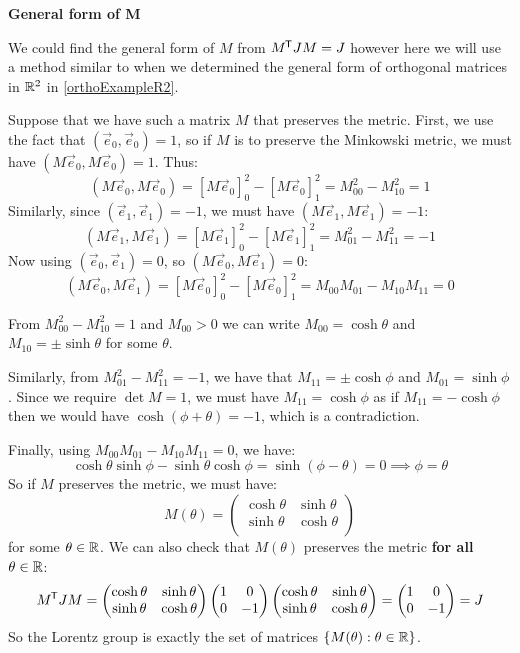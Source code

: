 \documentclass[../main.tex]{subfiles}
\begin{document}
\textbf{General form of M}\par
We could find the general form of $M$ from $M^{{\mkern-1.5mu\mathsf{T}}}JM = J$ however here we will use a method similar to when we determined the general form of orthogonal matrices in $\mathbb{R}^2$ in \cref{orthoExampleR2}.

Suppose that we have such a matrix $M$ that preserves the metric.
First, we use the fact that $(\vec{e}_0, \vec{e}_0) = 1$, so if $M$ is to preserve the Minkowski metric, we must have $(M\vec{e}_0, M\vec{e}_0) = 1$.
Thus:
\[
  (M\vec{e}_0, M\vec{e}_0) = [M\vec{e}_0]^2_0 - [M\vec{e}_0]^2_1 = M_{0 0}^2 - M_{1 0}^2 = 1
\]
Similarly, since $(\vec{e}_1, \vec{e}_1) = -1$, we must have $(M\vec{e}_1, M\vec{e}_1) = -1$:
\[
  (M\vec{e}_1, M\vec{e}_1) = [M\vec{e}_1]^2_0 - [M\vec{e}_1]^2_1 = M_{0 1}^2 - M_{1 1}^2 = -1
\]
Now using $(\vec{e}_0, \vec{e}_1) = 0$, so $(M\vec{e}_0, M\vec{e}_1) = 0$:
\[
  (M\vec{e}_0, M\vec{e}_1) = [M\vec{e}_0]^2_0 - [M\vec{e}_0]^2_1 = M_{0 0}M_{0 1} - M_{1 0}M_{1 1} = 0
\]

From $M_{0 0}^2 - M_{1 0}^2 = 1$ and $M_{0 0} > 0$ we can write $M_{0 0} = \cosh \theta$ and $M_{1 0} = \pm \sinh \theta$ for some $\theta$.

Similarly, from $M_{0 1}^2 - M_{1 1}^2 = -1$, we have that $M_{1 1} = \pm \cosh \phi$ and $M_{0 1} = \sinh \phi$.
Since we require $\det M = 1$, we must have $M_{1 1} = \cosh \phi$ as if $M_{1 1} = - \cosh \phi$ then we would have $\cosh(\phi + \theta) = -1$, which is a contradiction.

Finally, using $M_{0 0}M_{0 1} - M_{1 0}M_{1 1} = 0$, we have:
\[
  \cosh \theta \sinh \phi - \sinh \theta \cosh \phi = \sinh(\phi - \theta) = 0 \implies \phi = \theta
\]
So if $M$ preserves the metric, we must have:
\[
  M(\theta) = \begin{pmatrix}
  \cosh \theta & \sinh \theta \\
  \sinh \theta & \cosh \theta \\
  \end{pmatrix}
\]
for some $\theta \in \mathbb{R}$.
We can also check that $M(\theta)$ preserves the metric \textbf{for all} $\theta \in \mathbb{R}$:
\[
  M^{{\mkern-1.5mu\mathsf{T}}} J M = \begin{pmatrix}
  \cosh \theta & \sinh \theta \\
  \sinh \theta & \cosh \theta \\
  \end{pmatrix} \begin{pmatrix}
  1 & 0 \\
  0 & -1 \\
  \end{pmatrix} \begin{pmatrix}
  \cosh \theta & \sinh \theta \\
  \sinh \theta & \cosh \theta \\
  \end{pmatrix} = \begin{pmatrix}
  1 & 0 \\
  0 & -1 \\
  \end{pmatrix} = J
\]
So the Lorentz group is exactly the set of matrices $\{M(\theta): \theta \in \mathbb{R}\}$.
\end{document}
